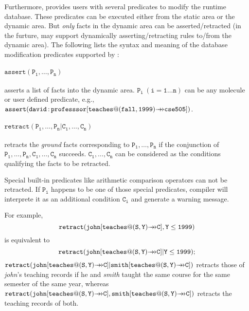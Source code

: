 \documentclass[11pt]{report}
\begin{document}
Furthermore, \FLORA provides users with several predicates to modify the runtime database.
These predicates can be executed either from the static area or the dynamic area. But
\emph{only} facts in the dynamic area can be asserted/retracted (in the furture, \FLORA
may support dynamically asserting/retracting rules to/from the dynamic area). The following
lists the syntax and meaning of the database modification predicates supported by \FLORA:

\paragraph{$\mathtt{assert(P_1,\ldots,P_n)}$} asserts a list of facts into the dynamic area.
$\mathtt{P_i~(i=1{\ldots}n)}$ can be any \fl molecule or user defined predicate, e.g.,
$\mathtt{assert(david{\,{\bf{:}}\,}professsor[teaches@(fall,1999){{\rightarrow\!\!\!\!\rightarrow}}cse505])}$.

\paragraph{$\mathtt{retract(P_1,\ldots,P_n | C_1,\ldots,C_n)}$} retracts the \emph{ground}
facts corresponding to $\mathtt{P_1,\ldots,P_n}$ if the conjunction of
$\mathtt{P_1,\ldots,P_n,C_1,\ldots,C_n}$ succeeds. $\mathtt{C_1,\ldots,C_n}$ can be
considered as the conditions qualifying the facts to be retracted.

Special built-in predicates like arithmetic comparison operators can not be retracted.
If $\mathtt{P_i}$ happens to be one of those special predicates, \FLORA compiler will
interprete it as an additional condition $\mathtt{C_i}$ and generate a warning message.

For example,
\begin{displaymath}
\mathtt{retract(john[teaches@(S,Y){{\rightarrow\!\!\!\!\rightarrow}}C],Y\leq1999)}
\end{displaymath}
is equivalent to
\begin{displaymath}
\mathtt{retract(john[teaches@(S,Y){{\rightarrow\!\!\!\!\rightarrow}}C]|Y\leq1999)};
\end{displaymath}
$\mathtt{retract(john[teaches@(S,Y){\mvd}C]|smith[teaches@(S,Y){\mvd}C])}$
 retracts those of {\it john}'s teaching records if he and {\it smith} taught the same course
for the same semester of the same year, whereas
$\mathtt{retract(john[teaches@(S,Y){\mvd}C],smith[teaches@(S,Y){\mvd}C])}$
retracts the teaching records of both.
\end{document}
